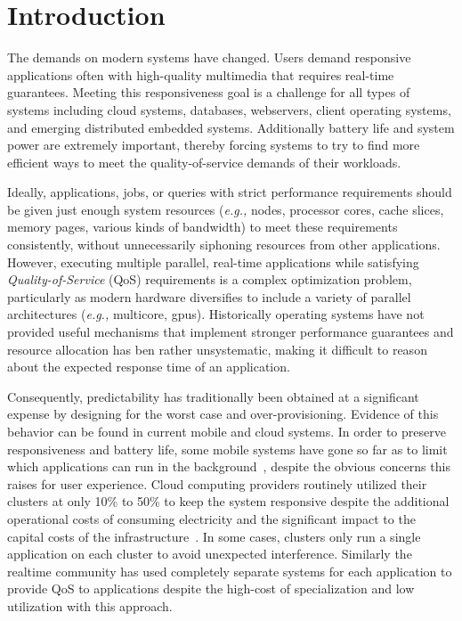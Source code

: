 \section{Introduction}


The demands on modern systems have changed.  Users demand responsive applications often with high-quality multimedia that requires real-time guarantees.  Meeting this responsiveness goal is a challenge for all types of systems including cloud systems, databases, webservers, client operating systems, and emerging distributed embedded systems. Additionally battery life and system power are extremely important, thereby forcing systems to try to find more efficient ways to meet the quality-of-service demands of their workloads.

Ideally, applications, jobs, or queries with strict performance requirements should be given just enough system resources (\emph{e.g.,} nodes, processor cores, cache slices, memory pages, various kinds of bandwidth) to meet these requirements consistently, without unnecessarily siphoning resources from other applications. However, executing multiple parallel, real-time applications while satisfying  \emph{Quality-of-Service} (QoS) requirements is a complex optimization problem, particularly as modern hardware diversifies to include a variety of parallel architectures (\emph{e.g.,} multicore, gpus).  Historically operating systems have not provided useful mechanisms that implement stronger performance guarantees and resource allocation has ben rather unsystematic, making it difficult to reason about the expected response time of an application. 

Consequently, predictability has traditionally been obtained at a significant expense by designing for the worst case and over-provisioning.  Evidence of this behavior can be found in current mobile and cloud systems.  In order to preserve responsiveness and battery life,  some mobile systems have gone so far as to limit which applications can run in the background~\cite{iOsDev}, despite the obvious concerns this raises for user experience.  Cloud computing providers routinely utilized their clusters at only 10\% to 50\% to keep the system responsive despite the additional operational costs of consuming electricity and the significant impact to the capital costs of the infrastructure~\cite{Barroso2009,Hennessy2011}.   In some cases, clusters only run a single application on each cluster to avoid unexpected interference.  Similarly the realtime community has used completely separate systems for each application to provide QoS to applications despite the high-cost of specialization and low utilization with this approach.

